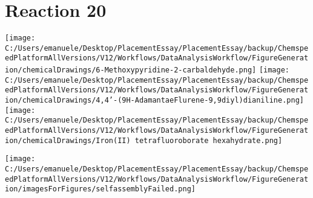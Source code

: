 \documentclass{article}%
\begin{document}
\section*{Reaction 20}%
%
\begin{scheme}[H]%
\begin{minipage}{0.5\textwidth}%
\texttt{[image: C:/Users/emanuele/Desktop/PlacementEssay/PlacementEssay/backup/ChemspeedPlatformAllVersions/V12/Workflows/DataAnalysisWorkflow/FigureGeneration/chemicalDrawings/6-Methoxypyridine-2-carbaldehyde.png]}%
\texttt{[image: C:/Users/emanuele/Desktop/PlacementEssay/PlacementEssay/backup/ChemspeedPlatformAllVersions/V12/Workflows/DataAnalysisWorkflow/FigureGeneration/chemicalDrawings/4,4'-(9H-AdamantaeFlurene-9,9diyl)dianiline.png]}%
\texttt{[image: C:/Users/emanuele/Desktop/PlacementEssay/PlacementEssay/backup/ChemspeedPlatformAllVersions/V12/Workflows/DataAnalysisWorkflow/FigureGeneration/chemicalDrawings/Iron(II) tetrafluoroborate hexahydrate.png]}%
\end{minipage}%
\begin{minipage}{0.5\textwidth}%
\begin{center}%
\texttt{[image: C:/Users/emanuele/Desktop/PlacementEssay/PlacementEssay/backup/ChemspeedPlatformAllVersions/V12/Workflows/DataAnalysisWorkflow/FigureGeneration/imagesForFigures/selfassemblyFailed.png]}%
\end{center}%
\end{minipage}%
\caption{Self-assembly of components 6, 13, with Iron(II) in a 3.0:1.5:1.0 molar ratio in CH$_3$CN at 60\textdegree C for 40h. These are the reagents (starting materials) for reaction 20.}%
\end{scheme}%
\end{document}
